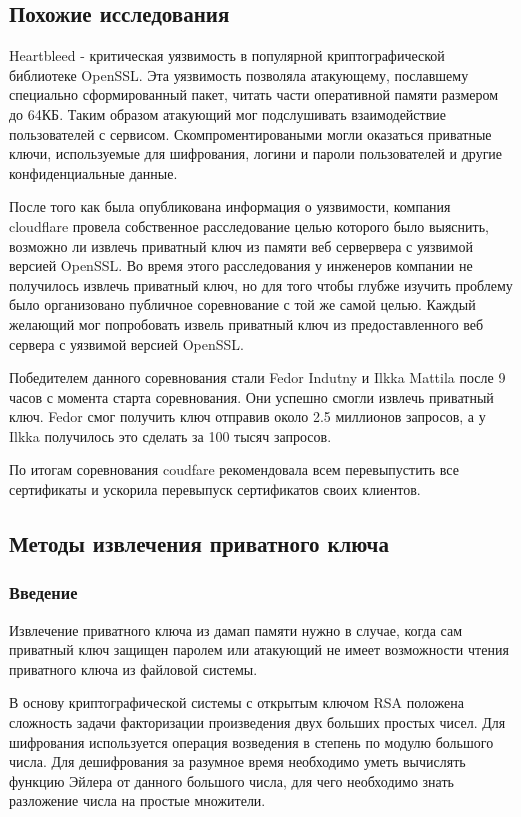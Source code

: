 \documentclass[20pt]{article}
\begin{document}
\subsection{Похожие исследования}
Heartbleed - критическая уязвимость в популярной криптографической библиотеке
OpenSSL. Эта уязвимость позволяла атакующему, пославшему специально сформированный
пакет, читать части оперативной памяти размером до 64КБ. Таким образом атакующий
мог подслушивать взаимодействие пользователей с сервисом. Скомпроментироваными
могли оказаться приватные ключи, используемые для шифрования, логини и пароли
пользователей и другие конфиденциальные данные.

После того как была опубликована информация о уязвимости, компания cloudflare
провела собственное расследование целью которого было выяснить, возможно ли извлечь
приватный ключ из памяти веб сервервера с уязвимой версией OpenSSL. Во время этого
расследования у инженеров компании не получилось извлечь приватный ключ, но для
того чтобы глубже изучить проблему было организовано публичное соревнование с той
же самой целью. Каждый желающий мог попробовать извель приватный ключ из
предоставленного веб сервера с уязвимой версией OpenSSL.

Победителем данного соревнования стали Fedor Indutny и Ilkka Mattila после 9 часов
с момента старта соревнования. Они успешно смогли извлечь приватный ключ. Fedor
смог получить ключ отправив около 2.5 миллионов запросов, а у Ilkka получилось
это сделать за 100 тысяч запросов.

По итогам соревнования coudfare рекомендовала всем перевыпустить все сертификаты
и ускорила перевыпуск сертификатов своих клиентов.

\subsection{Методы извлечения приватного ключа \cite{playing-hide-and-seek-with-stored-keys} }

\subsubsection{Введение}
Извлечение приватного ключа из дамап памяти нужно в случае, когда сам приватный
ключ защищен паролем или атакующий не имеет возможности чтения приватного ключа
из файловой системы.

В основу криптографической системы с открытым ключом RSA положена сложность задачи
факторизации произведения двух больших простых чисел. Для шифрования используется
операция возведения в степень по модулю большого числа. Для дешифрования за
разумное время необходимо уметь вычислять функцию Эйлера от данного большого
числа, для чего необходимо знать разложение числа на простые множители.
\end{document}
